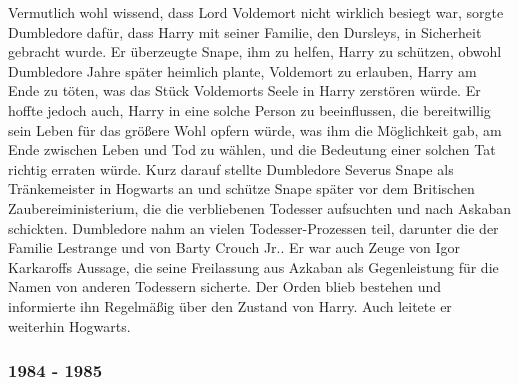 \documentclass[a4paper, 10pt]{article}
\begin{document}
Vermutlich wohl wissend, dass Lord Voldemort nicht wirklich besiegt war, sorgte Dumbledore dafür, dass Harry mit seiner Familie, den Dursleys, in Sicherheit gebracht wurde. Er überzeugte Snape, ihm zu helfen, Harry zu schützen, obwohl Dumbledore Jahre später heimlich plante, Voldemort zu erlauben, Harry am Ende zu töten, was das Stück Voldemorts Seele in Harry zerstören würde. Er hoffte jedoch auch, Harry in eine solche Person zu beeinflussen, die bereitwillig sein Leben für das größere Wohl opfern würde, was ihm die Möglichkeit gab, am Ende zwischen Leben und Tod zu wählen, und die Bedeutung einer solchen Tat richtig erraten würde. Kurz darauf stellte Dumbledore Severus Snape als Tränkemeister in Hogwarts an und schütze Snape später vor dem Britischen Zaubereiministerium, die die verbliebenen Todesser aufsuchten und nach Askaban schickten. Dumbledore nahm an vielen Todesser-Prozessen teil, darunter die der Familie Lestrange und von Barty Crouch Jr.. Er war auch Zeuge von Igor Karkaroffs Aussage, die seine Freilassung aus Azkaban als Gegenleistung für die Namen von anderen Todessern sicherte. Der Orden blieb bestehen und informierte ihn Regelmäßig über den Zustand von Harry. Auch leitete er weiterhin Hogwarts.

\subsubsection*{1984 - 1985}
\end{document}
